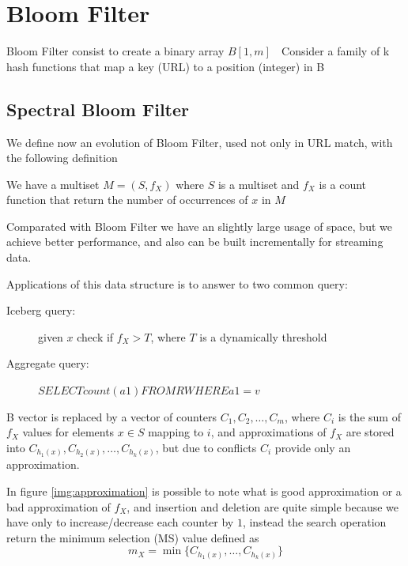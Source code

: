 \section{Bloom Filter}
    Bloom Filter consist to create a binary array $B[1, m]$ 
 Consider a family of k hash functions that map a
key (URL) to a position (integer) in B

\subsection{Spectral Bloom Filter}
    We define now an evolution of Bloom Filter, used not only in URL match, with the following definition
    \begin{defi}
         We have a multiset $M = (S, f_X)$ where $S$ is a multiset and $f_X$ is a count function that return the number of occurrences of $x$ in $M$
    \end{defi}
    Comparated with Bloom Filter we have an slightly large usage of space, but we achieve better performance, and also can be built incrementally for streaming data.

    Applications of this data structure is to answer to two common query:
    \begin{description}
        \item [Iceberg query: ] given $x$ check if $f_X > T$, where $T$ is a dynamically threshold
	\item [Aggregate query: ] $SELECT count(a1) FROM R WHERE a1 = v$
    \end{description}
    B vector is replaced by a vector of counters $C_1, C_2, \dots, C_m$, where $C_i$ is the sum of $f_X$ values for elements $x \in S$ mapping to $i$, and approximations of $f_X$ are stored 
    into $C_{h_1(x)}, C_{h_2(x)}, \dots, C_{h_k(x)}$, but due to conflicts $C_i$ provide only an approximation.

    In figure \ref{img:approximation} is possible to note what is good approximation or a bad approximation of $f_X$, and insertion and deletion are quite simple because we have only
    to increase/decrease each counter by $1$, instead the search operation return the minimum selection (MS) value defined as 
    \[ m_X = \min \{C_{h_1(x)}, \dots, C_{h_k(x)}\} \]

